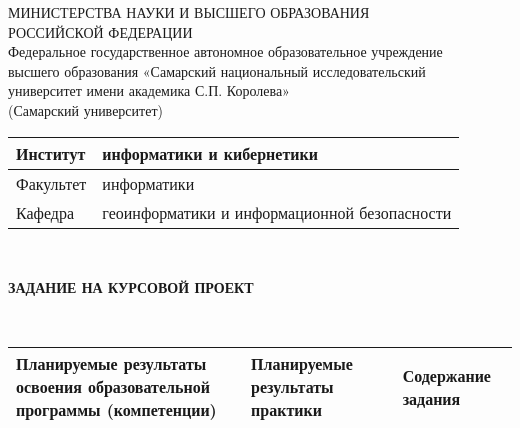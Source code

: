 \documentclass[oneside,final,14pt]{extreport}
\begin{document}
		\begin{singlespacing}
		\begin{centering}
		{ 	
			МИНИСТЕРСТВА НАУКИ И ВЫСШЕГО ОБРАЗОВАНИЯ \\ 
			РОССИЙСКОЙ ФЕДЕРАЦИИ\\
			Федеральное государственное автономное образовательное учреждение\\
			высшего образования «Самарский национальный исследовательский\\
			университет имени академика С.П. Королева»\\{(Самарский университет)}\\	
		}
		\end{centering}
      	     
        \vfill
        
        \noindent
        \begin{minipage} {\textwidth}
        		\begin{tabular}{
        				|p{}
        				|p{}|}
        			\hline 
        			Институт & информатики и кибернетики \\ \hline
        			Факультет & информатики  \\ \hline
        			Кафедра & геоинформатики и информационной безопасности \\ 
        			\hline
        		\end{tabular}
        \end{minipage}\\

    
        \vfill
        
		\centerline {\bf ЗАДАНИЕ НА КУРСОВОЙ ПРОЕКТ } 
		\\
        \noindent
        \begin{minipage} {\textwidth}
          \begin{center}
          	\begin{tabular}{
          			|p{}
          			|p{}
          			|p{}|
          		}
          		\hline  
          		Планируемые результаты освоения образовательной программы (компетенции) & 
          		Планируемые результаты практики &
          		Содержание задания \\ \hline
          		

\end{tabular}
\end{center}
\end{minipage}
\end{singlespacing}
\end{document}
